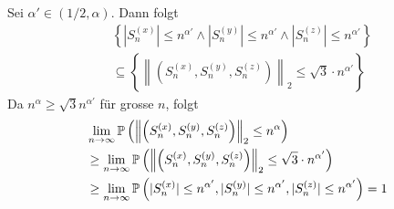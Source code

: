 Sei $\alpha' \in (1/2, \alpha)$. Dann folgt 
\begin{align*}
    &\left\{|S_n^{(x)}| \leq n^{\alpha'} \land |S_n^{(y)}| \leq n^{\alpha'} \land |S_n^{(z)}| \leq n^{\alpha'}\right\} \\
    &\subseteq \left\{\left\lVert\left(S_n^{(x)}, S_n^{(y)}, S_n^{(z)}\right)\right\rVert_2 \leq \sqrt{3} \cdot n^{\alpha'}\right\}
\end{align*}
Da $n^\alpha \geq \sqrt{3}n^{\alpha'}$ für grosse $n$, folgt
\begin{align*}
    &\lim_{n\to \infty} \mathbb{P}\left(\left\lVert\left(S_n^{(x)}, S_n^{(y)}, S_n^{(z)}\right)\right\rVert_2 \leq n^\alpha\right)\\
     &\geq \lim_{n\to \infty} \mathbb{P}\left(\left\lVert\left(S_n^{(x)}, S_n^{(y)}, S_n^{(z)}\right)\right\rVert_2 \leq \sqrt{3} \cdot n^{\alpha'}\right)\\
     &\geq \lim_{n\to \infty} \mathbb{P}\left(|S_n^{(x)}| \leq n^{\alpha'}, |S_n^{(y)}| \leq n^{\alpha'}, |S_n^{(z)}| \leq n^{\alpha'}\right) = 1
\end{align*}